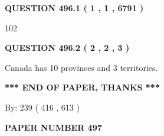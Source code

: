 \documentclass[12pt]{article}
\begin{document}
 
 
 
   
   
  
\vspace{0.2in}
  
{\textbf{\Large{QUESTION
496.1 
 ( 1 , 1 , 6791 )
}}}
  
  
 
 
\noindent{}

102
 
 
  
\vspace{0.2in}
  
{\textbf{\Large{QUESTION
496.2 
 ( 2 , 2 , 3 )
}}}
  
  
 
 
\noindent{}
 
 
Canada has 10  provinces and 3 territories.
 
 
 
 
   
   
 \vspace{0.2in}
 
   
   
   
   
\vspace{1.0in} 
{\textbf{\large{ *** END OF PAPER, THANKS *** }}} 
   
   
\hspace{1.0in} By: 
 239 ( 416 ,  613 )
   
   
   
   
\newpage 
\setcounter{page}{ 
   497001 } 
   
   
   
   
 {\textbf{ \Large{ PAPER NUMBER  497  }}}
   
   
\vspace{0.2in}
   
   
   
   
   
   
 \vspace{0.2in}
 
 
 
 
   
   
  
\vspace{0.2in}
  
\end{document}
